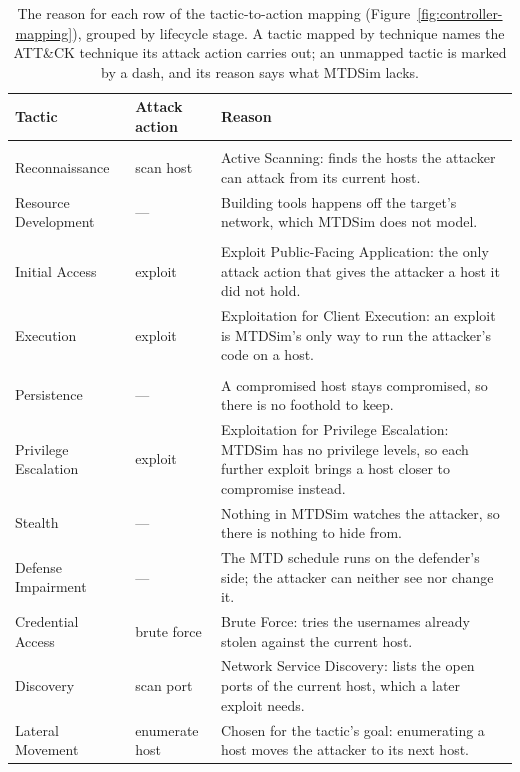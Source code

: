 \begin{table}[htbp]
\centering
\caption[Reasons for the tactic-to-action mapping]{The reason for each row of the tactic-to-action mapping (Figure~\ref{fig:controller-mapping}), grouped by lifecycle stage. A tactic mapped by technique names the ATT\&CK technique its attack action carries out; an unmapped tactic is marked by a dash, and its reason says what MTDSim lacks.}
\label{tab:controller-mapping}
\tablestyle
\begin{tabular}{@{}l l P{0.52\textwidth}@{}}
\toprule
Tactic & Attack action & Reason \\
\midrule
{} \\
Reconnaissance & scan host & Active Scanning: finds the hosts the attacker can attack from its current host. \\
Resource Development & --- & Building tools happens off the target's network, which MTDSim does not model. \\
\midrule
{} \\
Initial Access & exploit & Exploit Public-Facing Application: the only attack action that gives the attacker a host it did not hold. \\
Execution & exploit & Exploitation for Client Execution: an exploit is MTDSim's only way to run the attacker's code on a host. \\
\midrule
{} \\
Persistence & --- & A compromised host stays compromised, so there is no foothold to keep. \\
Privilege Escalation & exploit & Exploitation for Privilege Escalation: MTDSim has no privilege levels, so each further exploit brings a host closer to compromise instead. \\
Stealth & --- & Nothing in MTDSim watches the attacker, so there is nothing to hide from. \\
Defense Impairment & --- & The MTD schedule runs on the defender's side; the attacker can neither see nor change it. \\
Credential Access & brute force & Brute Force: tries the usernames already stolen against the current host. \\
Discovery & scan port & Network Service Discovery: lists the open ports of the current host, which a later exploit needs. \\
Lateral Movement & enumerate host & Chosen for the tactic's goal: enumerating a host moves the attacker to its next host. \\

\end{tabular}
\end{table}
